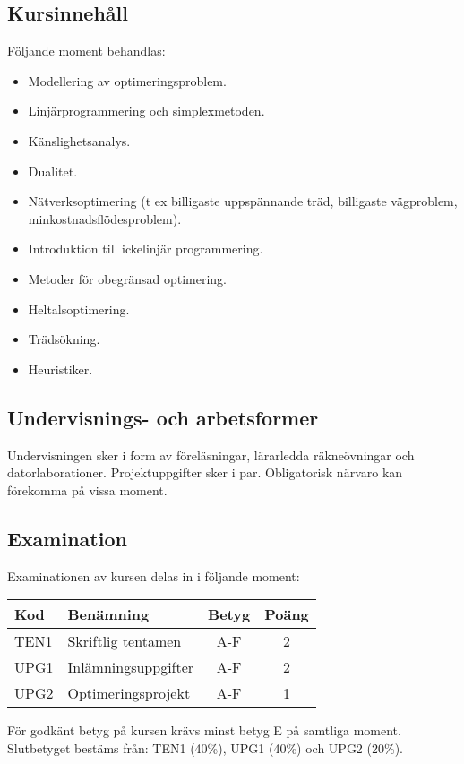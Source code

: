 \subsection*{Kursinnehåll}

Följande moment behandlas:

\begin{itemize}
\tightlist
\item
  Modellering av optimeringsproblem.
\item
  Linjärprogrammering och simplexmetoden.
\item
  Känslighetsanalys.
\item
  Dualitet.
\item
  Nätverksoptimering (t ex billigaste uppspännande träd, billigaste
  vägproblem, minkostnadsflödesproblem).
\item
  Introduktion till icke­linjär programmering.
\item
  Metoder för obegränsad optimering.
\item
  Heltalsoptimering.
\item
  Trädsökning.
\item
  Heuristiker.
\end{itemize}

\subsection*{Undervisnings- och
arbetsformer}

Undervisningen sker i form av föreläsningar, lärarledda räkneövningar
och datorlaborationer. Projektuppgifter sker i par. Obligatorisk närvaro
kan förekomma på vissa moment.

\subsection*{Examination}

Examinationen av kursen delas in i följande moment:

\begin{longtable}[]{@{}llcc@{}}
\toprule
\textsf{Kod} & \textsf{Benämning} & \textsf{Betyg} & \textsf{Poäng}\tabularnewline
\midrule
\endhead
TEN1 & Skriftlig tentamen & A-F & 2\tabularnewline
UPG1 & Inlämningsuppgifter & A-F & 2\tabularnewline
UPG2 & Optimeringsprojekt & A-F & 1\tabularnewline
\bottomrule
\end{longtable}

För godkänt betyg på kursen krävs minst betyg E på samtliga moment.
Slutbetyget bestäms från: TEN1 (40\%), UPG1 (40\%) och UPG2 (20\%).

